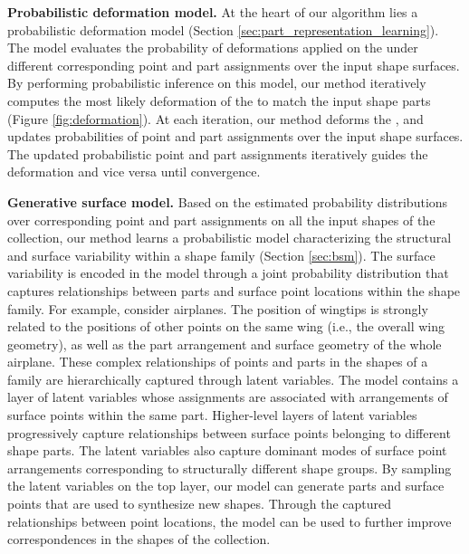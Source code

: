 \textbf{Probabilistic deformation model.} At the heart of our algorithm lies a probabilistic deformation model (Section \ref{sec:part_representation_learning}). The model evaluates the probability of deformations applied on the  under different corresponding point and part assignments over the input shape surfaces. By performing probabilistic inference on this model, our method iteratively computes the most likely deformation of the  to match the input shape parts (Figure \ref{fig:deformation}). At each iteration, our method deforms the , and updates probabilities of point and part assignments over the input shape surfaces. The updated probabilistic point and part assignments iteratively guides the deformation and vice versa until convergence.

\textbf{Generative surface model.} Based on the estimated probability distributions over corresponding point and part assignments on all the input shapes of the collection, our method learns a probabilistic model characterizing the structural and surface variability within a shape family (Section \ref{sec:bsm}). The surface variability is encoded in the model through a joint probability distribution that captures relationships between parts and surface point locations within the shape family. For example, consider airplanes. The position of wingtips is strongly related to the positions of other points on the same wing (i.e., the overall wing geometry), as well as the part arrangement and surface geometry of the whole airplane. These complex relationships of points and parts in the shapes of a family are hierarchically captured through latent variables. The model contains a layer of latent variables whose assignments are associated with arrangements of surface points within the same part. Higher-level layers of latent variables progressively capture relationships between surface points belonging to different shape parts. The latent variables also capture dominant modes of surface point arrangements corresponding to structurally different shape groups. By sampling the latent variables on the top layer, our model can generate parts and surface points that are used to synthesize new shapes.  Through the captured relationships between point locations, the model can be used to further improve correspondences in the shapes of the collection. 

